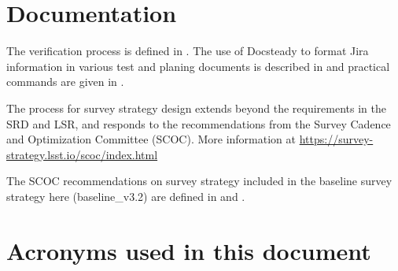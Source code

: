 

\newpage
\appendix
\section{Documentation}
The verification process is defined in .
The use of Docsteady to format Jira information in various test and planing documents is
described in  and practical commands are given in .

The process for survey strategy design extends beyond the requirements in the SRD and LSR, 
and responds to the recommendations from the Survey Cadence and Optimization Committee (SCOC). 
More information at \url{https://survey-strategy.lsst.io/scoc/index.html}

The SCOC recommendations on survey strategy included in the baseline survey strategy here (baseline_v3.2) are defined in 
 and . 

\section{Acronyms used in this document}\label{sec:acronyms}


\newpage

%
